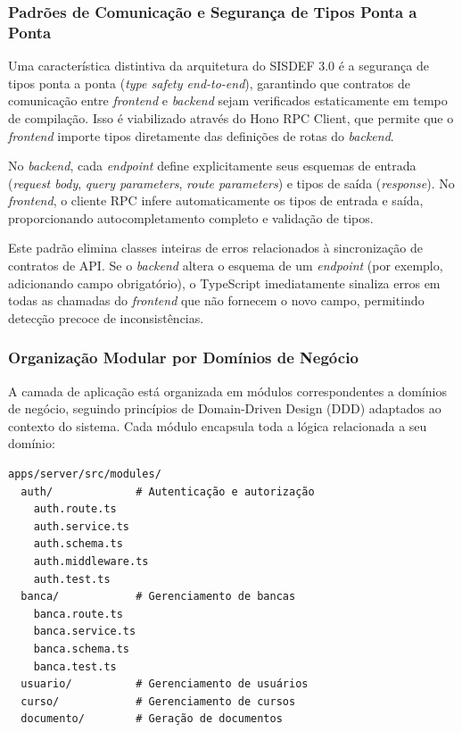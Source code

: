 \documentclass[nonacm, sigconf]{acmart}
\begin{document}
\subsubsection{Padrões de Comunicação e Segurança de Tipos Ponta a Ponta}

Uma característica distintiva da arquitetura do SISDEF 3.0 é a segurança de tipos ponta a ponta (\textit{type safety end-to-end}), garantindo que contratos de comunicação entre \textit{frontend} e \textit{backend} sejam verificados estaticamente em tempo de compilação. Isso é viabilizado através do Hono RPC Client, que permite que o \textit{frontend} importe tipos diretamente das definições de rotas do \textit{backend}.

No \textit{backend}, cada \textit{endpoint} define explicitamente seus esquemas de entrada (\textit{request body}, \textit{query parameters}, \textit{route parameters}) e tipos de saída (\textit{response}). No \textit{frontend}, o cliente RPC infere automaticamente os tipos de entrada e saída, proporcionando autocompletamento completo e validação de tipos.

Este padrão elimina classes inteiras de erros relacionados à sincronização de contratos de API. Se o \textit{backend} altera o esquema de um \textit{endpoint} (por exemplo, adicionando campo obrigatório), o TypeScript imediatamente sinaliza erros em todas as chamadas do \textit{frontend} que não fornecem o novo campo, permitindo detecção precoce de inconsistências.

\subsubsection{Organização Modular por Domínios de Negócio}

A camada de aplicação está organizada em módulos correspondentes a domínios de negócio, seguindo princípios de Domain-Driven Design (DDD) adaptados ao contexto do sistema. Cada módulo encapsula toda a lógica relacionada a seu domínio:

\begin{verbatim}
apps/server/src/modules/
  auth/             # Autenticação e autorização
    auth.route.ts
    auth.service.ts
    auth.schema.ts
    auth.middleware.ts
    auth.test.ts
  banca/            # Gerenciamento de bancas
    banca.route.ts
    banca.service.ts
    banca.schema.ts
    banca.test.ts
  usuario/          # Gerenciamento de usuários
  curso/            # Gerenciamento de cursos
  documento/        # Geração de documentos
\end{verbatim}
\end{document}
